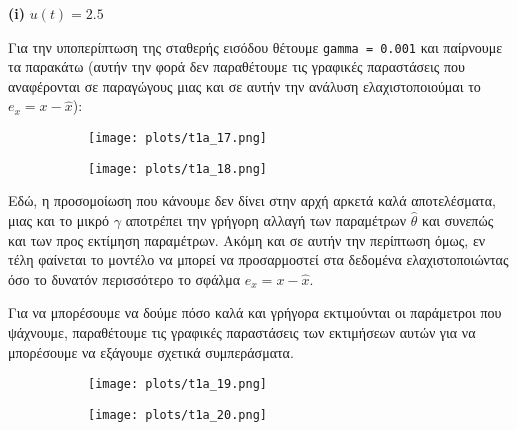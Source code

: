 \documentclass[12pt]{article} %
\numberwithin{equation}{section}  %
\begin{document}
\begin{center}
    \textbf{(i)} $u(t) = 2.5$
\end{center}

\noindent Για την υποπερίπτωση της σταθερής εισόδου θέτουμε \texttt{gamma = 0.001} και παίρνουμε τα παρακάτω (αυτήν την φορά δεν παραθέτουμε τις γραφικές παραστάσεις που αναφέρονται σε παραγώγους μιας και σε αυτήν την ανάλυση ελαχιστοποιούμαι το $e_x = x -\hat{x}$):

\begin{figure}[h!]
    \begin{subfigure}{0.45\textwidth}
        \centering
        \texttt{[image: plots/t1a\_17.png]}
        \caption{}
        \label{fig:t1a_17}
    \end{subfigure}
    \hfill
    \begin{subfigure}{0.45\textwidth}
        \centering
        \texttt{[image: plots/t1a\_18.png]}
        \caption{}
        \label{fig:t1a_18}
    \end{subfigure}

\end{figure}
Εδώ, η προσομοίωση που κάνουμε δεν δίνει στην αρχή αρκετά καλά αποτελέσματα, μιας και το μικρό $\gamma$ αποτρέπει την γρήγορη αλλαγή των παραμέτρων $\hat{\theta}$ και συνεπώς και των προς εκτίμηση παραμέτρων. Ακόμη και σε αυτήν την περίπτωση όμως, εν τέλη φαίνεται το μοντέλο να μπορεί να προσαρμοστεί στα δεδομένα ελαχιστοποιώντας όσο το δυνατόν περισσότερο το σφάλμα $e_x = x -\hat{x}$.


Για να μπορέσουμε να δούμε πόσο καλά και γρήγορα εκτιμούνται οι παράμετροι που ψάχνουμε, παραθέτουμε τις γραφικές παραστάσεις των εκτιμήσεων αυτών για να μπορέσουμε να εξάγουμε σχετικά συμπεράσματα.

\begin{figure}[h!]
    \begin{subfigure}{0.45\textwidth}
        \centering
        \texttt{[image: plots/t1a\_19.png]}
        \caption{}
        \label{fig:t1a_19}
    \end{subfigure}
    \hfill
    \begin{subfigure}{0.45\textwidth}
        \centering
        \texttt{[image: plots/t1a\_20.png]}
        \caption{}
        \label{fig:t1a_20}
    \end{subfigure}

\end{figure}
\end{document}
